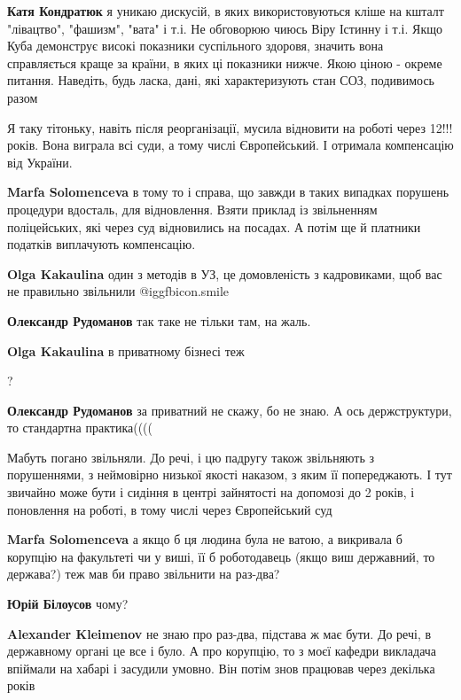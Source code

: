 \begin{itemize}
\begin{itemize}
\textbf{Катя Кондратюк} я уникаю дискусій, в яких використовуються кліше на кшталт "лівацтво", "фашизм", "вата" і т.і. Не обговорюю чиюсь Віру Істинну і т.і.
Якщо Куба демонструє високі показники суспільного здоровя, значить вона справляється краще за країни, в яких ці показники нижче. Якою ціною - окреме питання.
Наведіть, будь ласка, дані, які характеризують стан СОЗ, подивимось разом
\end{itemize} %


Я таку тітоньку, навіть після реорганізації, мусила відновити на роботі через
12!!! років. Вона виграла всі суди, а тому числі Європейський. І отримала
компенсацію від України.

\begin{itemize} %
\textbf{Marfa Solomenceva} в тому то і справа, що завжди в таких випадках порушень процедури вдосталь, для відновлення. Взяти приклад із звільненням поліцейських, які через суд відновились на посадах. А потім ще й платники податків виплачують компенсацію.


\textbf{Olga Kakaulina} один з методів в УЗ, це домовленість з кадровиками, щоб вас не правильно звільнили  @igg{fbicon.smile} 

\textbf{Олександр Рудоманов} так таке не тільки там, на жаль.


\textbf{Olga Kakaulina} в приватному бізнесі теж


?

\textbf{Олександр Рудоманов} за приватний не скажу, бо не знаю. А ось держструктури, то стандартна практика((((

Мабуть погано звільняли. До речі, і цю падругу також звільняють з порушеннями, з неймовірно низької якості наказом, з яким її попереджають. І тут звичайно може бути і сидіння в центрі зайнятості на допомозі до 2 років, і поновлення на роботі, в тому числі через Європейський суд

\textbf{Marfa Solomenceva} а якщо б ця людина була не ватою, а викривала б корупцію на факультеті чи у виші, її б роботодавець (якщо виш державний, то держава?) теж мав би право звільнити на раз-два?


\textbf{Юрій Білоусов} чому?

\textbf{Alexander Kleimenov} не знаю про раз-два, підстава ж має бути. До речі, в державному органі це все і було. А про корупцію, то з моєї кафедри викладача впіймали на хабарі і засудили умовно. Він потім знов працював через декілька років


\end{itemize}
\end{itemize}
